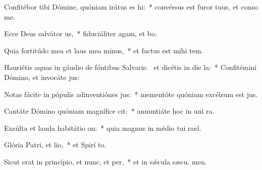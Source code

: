 \item Confitébor tibi Dómine, quóniam irátus es hi:~* convérsus est furor tuus, et conso  me.
\item Ecce Deus salvátor us,~* fiduciáliter agam, et  bo.
\item Quia fortitúdo mea et laus mea minus,~* et factus est mihi  tem.
\item Hauriétis aquas in gáudio de fóntibus Salvaris:~\pscross{} et dicétis in die la:~* Confitémini Dómino, et invocáte  jus:
\item Notas fácite in pópulis adinventiónes jus:~* mementóte quóniam excélsum est  jus.
\item Cantáte Dómino quóniam magnífice cit:~* annuntiáte hoc in uni ra.
\item Exsúlta et lauda habitátio on:~* quia magnus in médio tui  rael.
\item Glória Patri, et lio,~* et Spirí to.
\item Sicut erat in princípio, et nunc, et per,~* et in sǽcula sæcu. men.
